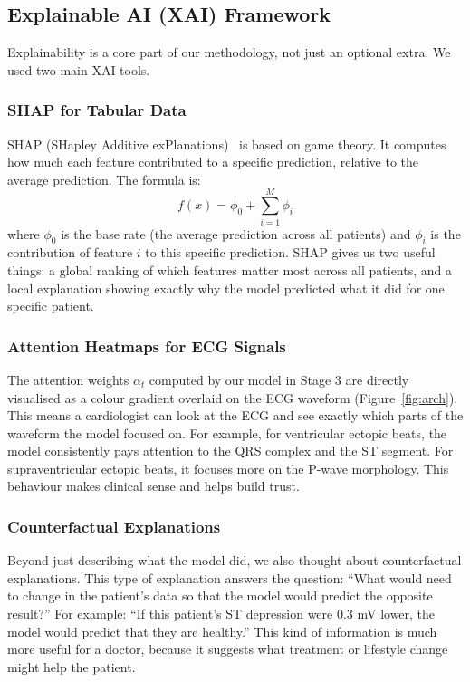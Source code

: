 \documentclass[10pt, twocolumn]{article}
\begin{document}
\subsection{Explainable AI (XAI) Framework}

Explainability is a core part of our methodology, not just an optional extra. We used two
main XAI tools.

\subsubsection{SHAP for Tabular Data}
SHAP (SHapley Additive exPlanations)~\cite{lundberg2017} is based on game theory. It
computes how much each feature contributed to a specific prediction, relative to the
average prediction. The formula is:
\begin{equation}
  f(x) = \phi_0 + \sum_{i=1}^{M} \phi_i
\end{equation}
where $\phi_0$ is the base rate (the average prediction across all patients) and $\phi_i$ is
the contribution of feature $i$ to this specific prediction.
SHAP gives us two useful things: a global ranking of which features matter most across
all patients, and a local explanation showing exactly why the model predicted what it did
for one specific patient.

\subsubsection{Attention Heatmaps for ECG Signals}
The attention weights $\alpha_t$ computed by our model in Stage 3 are directly visualised
as a colour gradient overlaid on the ECG waveform (Figure~\ref{fig:arch}).
This means a cardiologist can look at the ECG and see exactly which parts of the waveform
the model focused on.
For example, for ventricular ectopic beats, the model consistently pays attention to the
QRS complex and the ST segment. For supraventricular ectopic beats, it focuses more on
the P-wave morphology. This behaviour makes clinical sense and helps build trust.

\subsubsection{Counterfactual Explanations}
Beyond just describing what the model did, we also thought about counterfactual explanations.
This type of explanation answers the question: ``What would need to change in the patient's
data so that the model would predict the opposite result?''
For example: ``If this patient's ST depression were 0.3 mV lower, the model would predict
that they are healthy.'' This kind of information is much more useful for a doctor, because
it suggests what treatment or lifestyle change might help the patient.
\end{document}
